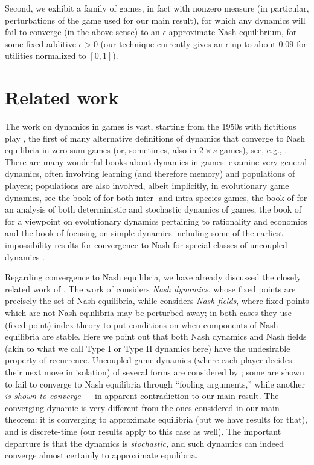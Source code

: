 \documentclass[11pt]{article}
\begin{document}
Second, we exhibit a family of games, in fact with nonzero measure (in particular, perturbations of the game used for our main result), for which any dynamics will fail to converge (in the above sense) to an $\epsilon$-approximate Nash equilibrium, for some fixed additive $\epsilon>0$ (our technique currently gives an $\epsilon$ up to about $0.09$ for utilities normalized to $[0,1]$).


\section{Related work}
The work on dynamics in games is vast, starting from the 1950s with fictitious play \citep{BrownFictitious,RobinsonFictitious}, the first of many alternative definitions of dynamics that converge to Nash equilibria in zero-sum games (or, sometimes, also in $2\times s$ games), see, e.g., \citet{KaniovskyYoung}.
There are many wonderful books about dynamics in games: \citet{Fudenberg} examine very general dynamics, often involving learning (and therefore memory) and populations of players; populations are also involved, albeit implicitly, in evolutionary game dynamics, see the book of \citet{HofbauerSigmund} for both inter- and intra-species games, the book of \citet{sandholm_population_2010} for an analysis of both deterministic and stochastic dynamics of games, the book of \citet{weibull_evolutionary_1998} for a viewpoint on evolutionary dynamics pertaining to rationality and economics and the book of \citet{hart2013simple} focusing on simple dynamics including some of the earliest impossibility results for convergence to Nash for special classes of uncoupled dynamics \citep{hart2003uncoupled}.


Regarding convergence to Nash equilibria, we have already discussed the closely related work of \citet{sorin_benaim}. The work of \citet{DemichelisRitzberger} considers \emph{Nash dynamics}, whose fixed points are precisely the set of Nash equilibria, while \citet{DeMichelisGermano1} considers {\em Nash fields}, where fixed points which are not Nash equilibria may be perturbed away; in both cases they use (fixed point) index theory to put conditions on when components of Nash equilibria are stable.  Here we point out that both Nash dynamics and Nash fields (akin to what we call Type I or Type II dynamics here) have the undesirable property of recurrence. Uncoupled game dynamics (where each player decides their next move in isolation) of several forms are considered by \citet{HartMasColell2}; some are shown to fail to converge to Nash equilibria through ``fooling arguments,'' while another {\em is shown to converge} --- in apparent contradiction to our main result. The converging dynamic is very different from the ones considered in our main theorem: it is converging to approximate equilibria (but we have results for that), and is discrete-time (our results apply to this case as well). The important departure is that the dynamics is {\em stochastic,} and such dynamics can indeed converge almost certainly to approximate equilibria.
\end{document}
